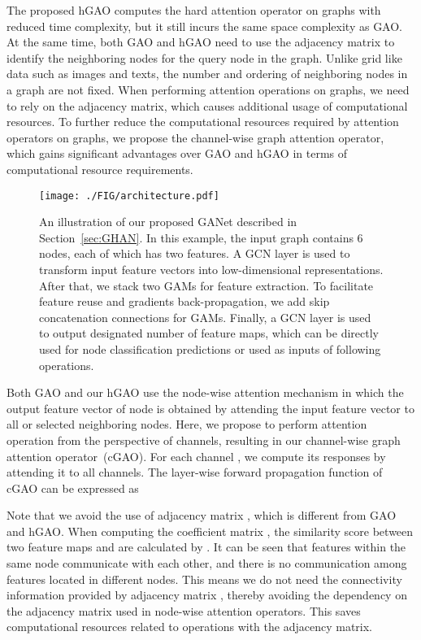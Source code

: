 \documentclass[sigconf]{acmart}
\begin{document}
The proposed hGAO computes the hard attention operator on graphs
with reduced time complexity, but it still incurs the same space
complexity as GAO. At the same time, both GAO and hGAO need to use
the adjacency matrix to identify the neighboring nodes for the query
node in the graph. Unlike grid like data such as images and texts,
the number and ordering of neighboring nodes in a graph are not
fixed. When performing attention operations on graphs, we need to
rely on the adjacency matrix, which causes additional usage of
computational resources. To further reduce the computational
resources required by attention operators on graphs, we propose the
channel-wise graph attention operator, which gains significant
advantages over GAO and hGAO in terms of computational resource
requirements.

\begin{figure*}[t]
\texttt{[image: ./FIG/architecture.pdf]}
\caption{An illustration of our proposed GANet described in Section~\ref{sec:GHAN}.
In this example, the input graph contains 6 nodes, each of which has two features.
A GCN layer is used to transform input feature vectors into low-dimensional representations.
After that, we stack two GAMs for feature extraction. To facilitate feature reuse
and gradients back-propagation, we add skip concatenation connections for GAMs. Finally,
a GCN layer is used to output designated number of feature maps, which can be
directly used for node classification predictions or used as inputs of following operations.
} \label{fig:architecture}
\end{figure*}

Both GAO and our hGAO use the node-wise attention mechanism in which
the output feature vector of node  is obtained by attending the
input feature vector to all or selected neighboring nodes. Here, we
propose to perform attention operation from the perspective of
channels, resulting in our channel-wise graph attention
operator~(cGAO). For each channel , we compute
its responses by attending it to all channels. The layer-wise
forward propagation function of cGAO can be expressed as

Note that we avoid the use of adjacency matrix ,
which is different from GAO and hGAO. When computing the coefficient
matrix , the similarity score between two feature
maps  and  are calculated by
. It can be seen that
features within the same node communicate with each other, and there
is no communication among features located in different nodes. This
means we do not need the connectivity information provided by
adjacency matrix , thereby avoiding the dependency on
the adjacency matrix used in node-wise attention operators. This
saves computational resources related to operations with the
adjacency matrix.
\end{document}
